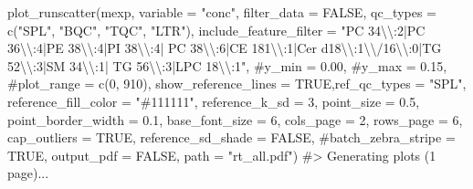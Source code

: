 \documentclass[
  letterpaper,
  DIV=11,
  numbers=noendperiod]{scrartcl}
\newenvironment{Shaded}{\begin{snugshade}}{\end{snugshade}}
\newcommand{\AttributeTok}[1]{\textcolor[rgb]{0.40,0.45,0.13}{#1}}
\newcommand{\CommentTok}[1]{\textcolor[rgb]{0.37,0.37,0.37}{#1}}
\newcommand{\ConstantTok}[1]{\textcolor[rgb]{0.56,0.35,0.01}{#1}}
\newcommand{\DecValTok}[1]{\textcolor[rgb]{0.68,0.00,0.00}{#1}}
\newcommand{\FloatTok}[1]{\textcolor[rgb]{0.68,0.00,0.00}{#1}}
\newcommand{\FunctionTok}[1]{\textcolor[rgb]{0.28,0.35,0.67}{#1}}
\newcommand{\NormalTok}[1]{\textcolor[rgb]{0.00,0.23,0.31}{#1}}
\newcommand{\SpecialCharTok}[1]{\textcolor[rgb]{0.37,0.37,0.37}{#1}}
\newcommand{\StringTok}[1]{\textcolor[rgb]{0.13,0.47,0.30}{#1}}
\begin{document}
\begin{Shaded}
\begin{Highlighting}[]
\FunctionTok{plot\_runscatter}\NormalTok{(mexp, }
  \AttributeTok{variable =} \StringTok{"conc"}\NormalTok{, }\AttributeTok{filter\_data =} \ConstantTok{FALSE}\NormalTok{,}
  \AttributeTok{qc\_types =} \FunctionTok{c}\NormalTok{(}\StringTok{"SPL"}\NormalTok{, }\StringTok{"BQC"}\NormalTok{, }\StringTok{"TQC"}\NormalTok{, }\StringTok{"LTR"}\NormalTok{), }
  \AttributeTok{include\_feature\_filter =} \StringTok{"PC 34}\SpecialCharTok{\textbackslash{}\textbackslash{}}\StringTok{:2|PC 36}\SpecialCharTok{\textbackslash{}\textbackslash{}}\StringTok{:4|PE 38}\SpecialCharTok{\textbackslash{}\textbackslash{}}\StringTok{:4|PI 38}\SpecialCharTok{\textbackslash{}\textbackslash{}}\StringTok{:4|}
\StringTok{    PC 38}\SpecialCharTok{\textbackslash{}\textbackslash{}}\StringTok{:6|CE 181}\SpecialCharTok{\textbackslash{}\textbackslash{}}\StringTok{:1|Cer d18}\SpecialCharTok{\textbackslash{}\textbackslash{}}\StringTok{:1}\SpecialCharTok{\textbackslash{}\textbackslash{}}\StringTok{/16}\SpecialCharTok{\textbackslash{}\textbackslash{}}\StringTok{:0|TG 52}\SpecialCharTok{\textbackslash{}\textbackslash{}}\StringTok{:3|SM 34}\SpecialCharTok{\textbackslash{}\textbackslash{}}\StringTok{:1|}
\StringTok{    TG 56}\SpecialCharTok{\textbackslash{}\textbackslash{}}\StringTok{:3|LPC 18}\SpecialCharTok{\textbackslash{}\textbackslash{}}\StringTok{:1"}\NormalTok{,}
    \CommentTok{\#y\_min = 0.00,}
    \CommentTok{\#y\_max = 0.15,}
    \CommentTok{\#plot\_range = c(0, 910), }
    \AttributeTok{show\_reference\_lines =} \ConstantTok{TRUE}\NormalTok{,}\AttributeTok{ref\_qc\_types =} \StringTok{"SPL"}\NormalTok{,}
    \AttributeTok{reference\_fill\_color =} \StringTok{"\#111111"}\NormalTok{,}
    \AttributeTok{reference\_k\_sd =} \DecValTok{3}\NormalTok{,}
    \AttributeTok{point\_size =} \FloatTok{0.5}\NormalTok{,}
    \AttributeTok{point\_border\_width =} \FloatTok{0.1}\NormalTok{,}
    \AttributeTok{base\_font\_size =} \DecValTok{6}\NormalTok{,}
    \AttributeTok{cols\_page =} \DecValTok{2}\NormalTok{,}
    \AttributeTok{rows\_page =} \DecValTok{6}\NormalTok{,}
    \AttributeTok{cap\_outliers =} \ConstantTok{TRUE}\NormalTok{,}
    \AttributeTok{reference\_sd\_shade =} \ConstantTok{FALSE}\NormalTok{,}
    \CommentTok{\#batch\_zebra\_stripe = TRUE, }
    \AttributeTok{output\_pdf =} \ConstantTok{FALSE}\NormalTok{,}
    \AttributeTok{path =} \StringTok{"rt\_all.pdf"}\NormalTok{)}
\CommentTok{\#\textgreater{} Generating plots (1 page)...}
\end{Highlighting}
\end{Shaded}
\end{document}
